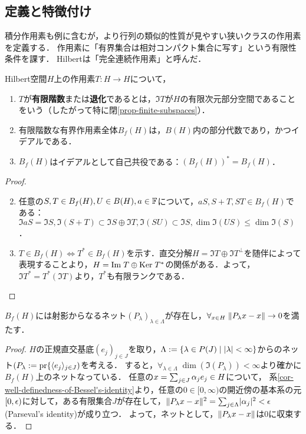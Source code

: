 \documentclass[uplatex,dvipdfmx]{jsreport}
\begin{document}
\subsection{定義と特徴付け}

\begin{tcolorbox}[colframe=ForestGreen, colback=ForestGreen!10!white,breakable,colbacktitle=ForestGreen!40!white,coltitle=black,fonttitle=\bfseries\sffamily,
title=]
    積分作用素も例に含むが，より行列の類似的性質が見やすい狭いクラスの作用素を定義する．
    作用素に「有界集合は相対コンパクト集合に写す」という有限性条件を課す．
    Hilbertは「完全連続作用素」と呼んだ．
\end{tcolorbox}

\begin{definition}
    Hilbert空間$H$上の作用素$T:H\to H$について，
    \begin{enumerate}
        \item $T$が\textbf{有限階数}または\textbf{退化}であるとは，$\Im T$が$H$の有限次元部分空間であることをいう（したがって特に閉\ref{prop-finite-subspaces}）．
        \item 有限階数な有界作用素全体$B_f(H)$は，$B(H)$内の部分代数であり，かつイデアルである．
        \item $B_f(H)$はイデアルとして自己共役である：$(B_f(H))^*=B_f(H)$．
    \end{enumerate}
\end{definition}
\begin{proof}\mbox{}
    \begin{enumerate}\setcounter{enumi}{1}
        \item 任意の$S,T\in B_f(H),U\in B(H),a\in\mathbb{F}$について，$aS,S+T,ST\in B_f(H)$である：$\Im aS=\Im S,\Im(S+T)\subset\Im S\oplus\Im T,\Im(SU)\subset\Im S,\dim\Im(US)\le\dim\Im(S)$．
        \item $T\in B_f(H)\Leftrightarrow T^*\in B_f(H)$を示す．直交分解$H=\Im T\oplus\Im T^\perp$を随伴によって表現することより，$H=\mathrm{Im}\; T\oplus\mathrm{Ker}\; T^*$の関係がある．よって，$\Im T^*=T^*(\Im T)$より，$T^*$も有限ランクである．
    \end{enumerate}
\end{proof}

\begin{lemma}[近似的単位元の構成]
    $B_f(H)$には射影からなるネット$(P_\lambda)_{\lambda\in\Lambda}$が存在し，$\forall_{x\in H}\;\|P_\lambda x-x\|\to 0$を満たす．
\end{lemma}
\begin{proof}
    $H$の正規直交基底${(e_j)}_{j\in J}$を取り，$\Lambda:=\left\{\lambda\in P(J)\mid \lvert\lambda\rvert<\infty\right\}$からのネット$(P_\lambda:=\mathrm{pr}\{\langle e_j\rangle_{j\in J})$を考える．
    すると，$\forall_{\lambda\in\Lambda}\;\dim(\Im(P_\lambda))<\infty$より確かに$B_f(H)$上のネットなっている．
    任意の$x=\sum_{j\in J}\alpha_je_j\in H$について，
    系\ref{cor-well-definedness-of-Bessel's-identity}より，任意の$0\in[0,\infty)$の開近傍の基本系の元$[0,\epsilon)$に対して，ある有限集合$J$が存在して，$\|P_\lambda x-x\|^2=\sum_{j\in\Lambda}\lvert\alpha_j\rvert^2<\epsilon$(Parseval's identity)が成り立つ．
    よって，ネットとして，$\|P_\lambda x-x\|$は$0$に収束する．
\end{proof}
\end{document}
